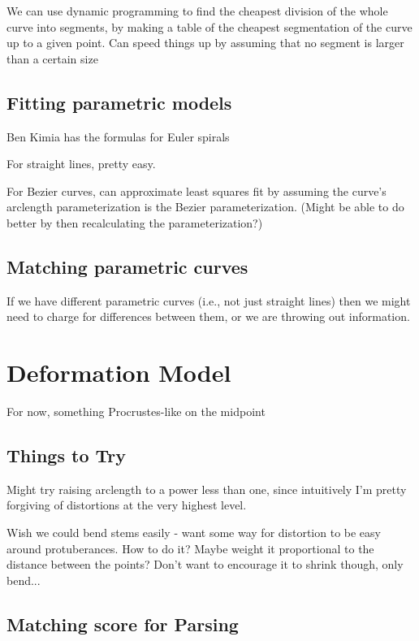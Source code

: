 \documentclass{article}
\begin{document}
  We can use dynamic programming to find the cheapest division of the
  whole curve into segments, by making a table of the cheapest
  segmentation of the curve up to a given point.  Can speed things up
  by assuming that no segment is larger than a certain size

\subsection{Fitting parametric models}
Ben Kimia has the formulas for Euler spirals

For straight lines, pretty easy.

For Bezier curves, can approximate least squares fit by assuming the
curve's arclength parameterization is the Bezier
parameterization. (Might be able to do better by then recalculating
the parameterization?)

\subsection{Matching parametric curves}
If we have different parametric curves (i.e., not just straight lines)
then we might need to charge for differences between them, or we are
throwing out information.

\section{Deformation Model}
For now, something Procrustes-like on the midpoint

\subsection{Things to Try}
\bitem
\item
Might try raising arclength to a power less than one, since
intuitively I'm pretty forgiving of distortions at the very highest level.

\item Wish we could bend stems easily - want some way for distortion
  to be easy around protuberances. How to do it? Maybe weight it
  proportional to the distance between the points? Don't want to
  encourage it to shrink though, only bend...

\eitem
\subsection{Matching score for Parsing}
\end{document}
